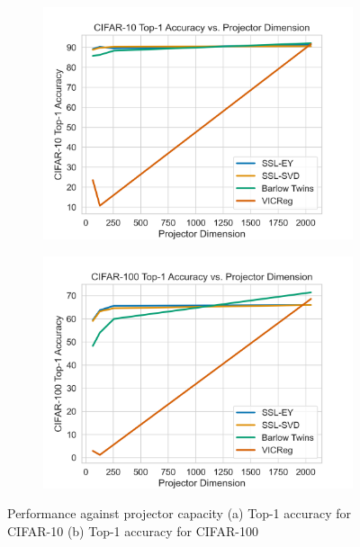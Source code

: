 \begin{figure}[h]
     \centering
     \begin{subfigure}[b]{0.49\textwidth}
         \centering
         \includegraphics[width=\textwidth]{figures/deep_learning/SSL/cifar10_proj_dim.png}
         \caption{}
         \label{fig:lrexp}
     \end{subfigure}
     \hfill
     \begin{subfigure}[b]{0.49\textwidth}
         \centering
         \includegraphics[width=\textwidth]{figures/deep_learning/SSL/cifar100_proj_dim.png}
         \caption{}
                 \label{fig:xrmb}
     \end{subfigure}
        \caption{Performance against projector capacity (a) Top-1 accuracy for CIFAR-10 (b) Top-1 accuracy for CIFAR-100}
    \label{fig:projectorablation}
\end{figure}


